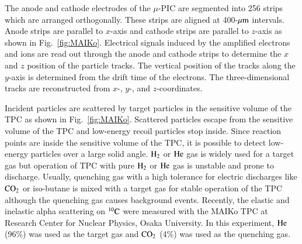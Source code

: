 \documentclass{jps-cp}
\begin{document}
%
The anode and cathode electrodes of the $\mu$-PIC are segmented into 256 strips 
which are arranged orthogonally.
These strips are aligned at 400-$\rm{\mu m}$ intervals.
Anode strips are parallel to $x$-axis and %
cathode strips are parallel to $z$-axis as shown in Fig.~\ref{fig:MAIKo}. %
Electrical signals induced by the amplified electrons and ions are read out through the anode and 
cathode strips to determine the $x$ and $z$ position of the particle tracks.
The vertical position of the tracks along the $y$-axis is determined 
from the drift time of the electrons.
The three-dimensional tracks are reconstructed from $x$-, $y$-, and $z$-coordinates.

Incident particles are scattered by target particles in the sensitive volume of the TPC as shown in Fig.~\ref{fig:MAIKo}.
Scattered particles escape from the sensitive volume of the TPC and low-energy recoil particles stop inside.
Since reaction points are inside the sensitive volume of the TPC,
it is possible to detect low-energy particles over a large solid angle.
$\rm{H}_{2}$ or $\rm{He}$ gas is widely used for a target gas
but operation of TPC with pure $\rm{H}_{2}$ or $\rm{He}$ gas is unstable and prone to discharge.
Usually, quenching gas with a high tolerance for electric discharges
like $\rm{CO}_{2}$ or iso-butane is mixed with a target gas
for stable operation of the TPC although the quenching gas causes background events.
Recently, the elastic and inelastic alpha scattering on ${}^{10}\rm{C}$ were measured with the MAIKo TPC
at Research Center for Nuclear Physics, Osaka University.
In this experiment, $\rm{He}$ (96\%) was used as the target gas and $\rm{CO}_{2}$ (4\%) was used as the quenching gas.
\end{document}
